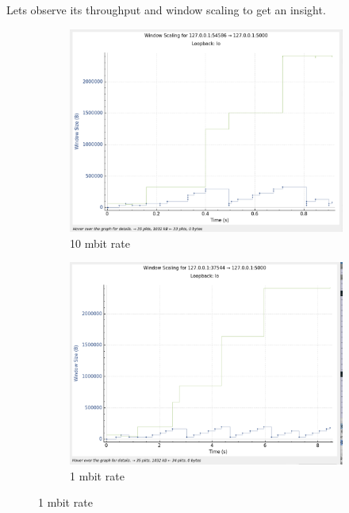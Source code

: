 \documentclass{report}
\begin{document}
Lets observe its throughput and window scaling to get an insight.
\begin{figure}[H]
    \centering
    \begin{subfigure}[b]{0.45\textwidth}
        \centering
        \includegraphics[width=\textwidth]{Pics/Westwood/r10mbit_s1m_ws}
        \caption{10 mbit rate }
    \end{subfigure}
    \hfill
    \begin{subfigure}[b]{0.45\textwidth}
        \centering
        \includegraphics[width=\textwidth]{Pics/Westwood/r1mbit_s1m_ws}
        \caption{1 mbit rate}
    \end{subfigure}
    \medskip


\end{figure}
\end{document}

